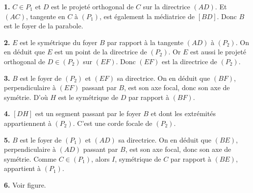 \documentclass[11pt]{article}
\begin{document}
\begin{center}
\end{center}

\textbf{1.} $C \in P_1$ et $D$ est le projeté orthogonal de $C$ sur la directrice $(AD)$. Et $(AC)$, tangente en $C$ à $(P_1)$, est également la médiatrice de $[BD]$. Donc $B$ est le foyer de la parabole.

\textbf{2.} $E$ est le symétrique du foyer $B$ par rapport à la tangente $(AD)$ à $(P_2)$. On en déduit que $E$ est un point de la directrice de $(P_2)$. Or $E$ est aussi le projeté orthogonal de $D \in (P_2)$ sur $(EF)$. Donc $(EF)$ est la directrice de $(P_2)$.

\textbf{3.} $B$ est le foyer de $(P_2)$ et $(EF)$ sa directrice. On en déduit que $(BF)$, perpendiculaire à $(EF)$ passant par $B$, est son axe focal, donc son axe de symétrie. D'où $H$ est le symétrique de $D$ par rapport à $(BF)$.

\textbf{4.} $[DH]$ est un segment passant par le foyer $B$ et dont les extrémités appartiennent à $(P_2)$. C'est une corde focale de $(P_2)$.

\textbf{5.} $B$ est le foyer de $(P_1)$ et $(AD)$ sa directrice. On en déduit que $(BE)$, perpendiculaire à $(AD)$ passant par $B$, est son axe focal, donc son axe de symétrie. Comme $C \in (P_1)$, alors $I$, symétrique de $C$ par rapport à $(BE)$, appartient à $(P_1)$.

\textbf{6.} Voir figure.
\end{document}
